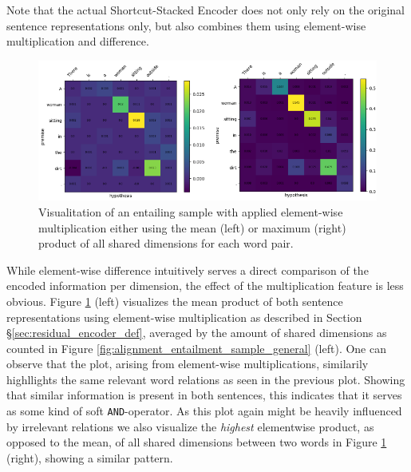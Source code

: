 \noindent
Note that the actual Shortcut-Stacked Encoder does not only rely on the original sentence representations only, but also combines them using element-wise multiplication and difference. 
\begin{figure}[tph!]
\centering
	\includegraphics[totalheight=7cm]{fig/alignment_entailment_sample_mult.png}
	\caption{Visualitation of an entailing sample with applied element-wise multiplication either using the mean (left) or maximum (right) product of all shared dimensions for each word pair.}
	\label{fig:alignment_entailment_sample_mult}
\end{figure}
While element-wise difference intuitively serves a direct comparison of the encoded information per dimension, the effect of the multiplication feature is less obvious. Figure \ref{fig:alignment_entailment_sample_mult} (left) visualizes the mean product of both sentence representations using element-wise multiplication as described in Section §\ref{sec:residual_encoder_def}, averaged by the amount of shared dimensions as counted in Figure \ref{fig:alignment_entailment_sample_general} (left). One can observe that the plot, arising from element-wise multiplications, similarily highllights the same relevant word relations as seen in the previous plot. Showing that similar information is present in both sentences, this indicates that it serves as some kind of soft \texttt{AND}-operator. As this plot again might be heavily influenced by irrelevant relations we also visualize the \textit{highest} elementwise product, as opposed to the mean, of all shared dimensions between two words in Figure \ref{fig:alignment_entailment_sample_mult} (right), showing a similar pattern.


